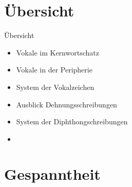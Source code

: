 \section{Übersicht}

\begin{frame}
  {Übersicht}
  \onslide<+->
  \begin{itemize}[<+->]
    \item Vokale im Kernwortschatz
    \item Vokale in der Peripherie
      \Halbzeile
    \item System der Vokalzeichen
    \item Ausblick Dehnungsschreibungen
    \item System der Diphthongschreibungen
      \Halbzeile
    \item \citet[Kapitel~15]{Schaefer2018b}
  \end{itemize}
\end{frame}

\section{Gespanntheit}

